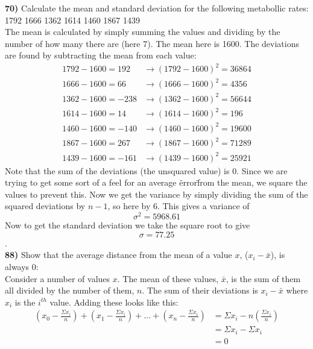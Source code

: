 \documentclass{scrartcl}
\begin{document}
\textbf{70)} Calculate the mean and standard deviation for the following metabollic rates: 1792 1666 1362 1614 1460 1867 1439\\
The mean is calculated by simply summing the values and dividing by the number of how many there are (here 7). The mean here is 1600. The deviations are found by subtracting the mean from each value:
\begin{align*}
1792 - 1600 = 192 &\rightarrow (1792 - 1600)^2 = 36864\\
1666 - 1600 = 66 &\rightarrow (1666 - 1600)^2 = 4356\\
1362 - 1600 = -238 &\rightarrow (1362 - 1600)^2 = 56644\\
1614 - 1600 = 14 &\rightarrow (1614 - 1600)^2 = 196\\
1460 - 1600 = -140 &\rightarrow (1460 - 1600)^2 = 19600\\
1867 - 1600 = 267 &\rightarrow (1867 - 1600)^2 = 71289\\
1439 - 1600 = -161 &\rightarrow (1439 - 1600)^2 = 25921
\end{align*}
Note that the sum of the deviations (the unsquared value) is 0. Since we are trying to get some sort of a feel for an average \"error\" from the mean, we square the values to prevent this. Now we get the variance by simply dividing the sum of the squared deviations by $n-1$, so here by 6. This gives a variance of $$\sigma^2 = 5968.61$$ Now to get the standard deviation we take the square root to give $$ \sigma = 77.25 $$.\\

\textbf{88)} Show that the average distance from the mean of a value $x$, ($x_i-\bar{x}$), is always 0:\\
Consider a number of values $x$. The mean of these values, $\bar{x}$, is the sum of them all divided by the number of them, $n$. The sum of their deviations is $x_i - \bar{x}$
where $x_i$ is the $i^{th}$ value. Adding these looks like this:
\begin{align*}
  (x_0 - \frac{\Sigma x_i}{n}) + (x_1 - \frac{\Sigma x_i}{n}) + ... + (x_n - \frac{\Sigma x_i}{n}) &= \Sigma x_i - n\left(\frac{\Sigma x_i}{n}\right)\\
  &= \Sigma x_i - \Sigma x_i\\
  &= 0
\end{align*}
\end{document}
